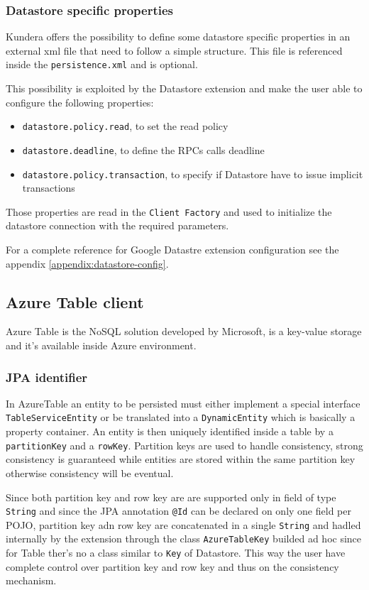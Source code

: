 \subsubsection{Datastore specific properties}
Kundera offers the possibility to define some datastore specific properties in an external xml file that need to follow a simple structure. This file is referenced inside the \texttt{persistence.xml} and is optional.

\newparagraph This possibility is exploited by the Datastore extension and make the user able to configure the following properties:
\begin{itemize}
\item \texttt{datastore.policy.read}, to set the read policy
\item \texttt{datastore.deadline}, to define the RPCs calls deadline
\item \texttt{datastore.policy.transaction}, to specify if Datastore have to issue implicit transactions
\end{itemize}
Those properties are read in the \texttt{Client Factory} and used to initialize the datastore connection with the required parameters.

\newparagraph For a complete reference for Google Datastre extension configuration see the appendix \ref{appendix:datastore-config}.

\subsection{Azure Table client}
\label{sec:kundera-table}
Azure Table \cite{online:azuretable} is the NoSQL solution developed by Microsoft, is a key-value storage and it's available inside Azure environment.

\subsubsection{JPA identifier}
In AzureTable an entity to be persisted must either implement a special interface \texttt{TableServiceEntity} or be translated into a \texttt{DynamicEntity} which is basically a property container.
An entity is then uniquely identified inside a table by a \texttt{partitionKey} and a \texttt{rowKey}.
\noindent Partition keys are used to handle consistency, strong consistency is guaranteed while entities are stored within the same partition key otherwise consistency will be eventual.

Since both partition key and row key are are supported only in field of type \texttt{String} and since the JPA annotation \texttt{@Id} can be declared on only one field per POJO, partition key adn row key are concatenated in a single \texttt{String} and hadled internally by the extension through the class \texttt{AzureTableKey} builded ad hoc since for Table ther's no a class similar to \texttt{Key} of Datastore.
\noindent This way the user have complete control over partition key and row key and thus on the consistency mechanism.

